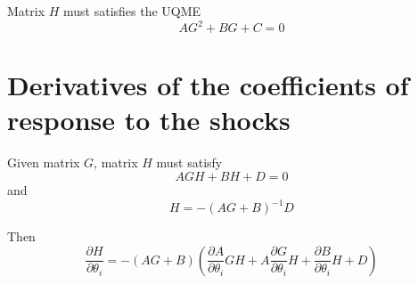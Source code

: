 \documentclass{article}
\begin{document}
Matrix $H$ must satisfies the UQME
\[
A G^2 + B G + C = 0
\]

\section{Derivatives of the coefficients of response to the shocks}
Given matrix $G$, matrix $H$ must satisfy
\[
A G H + BH + D = 0
\]
and
\[
H = -(AG + B)^{-1}D
\]

Then
\[
\frac{\partial H}{\partial \theta_i} = -(AG + B)\left(\frac{\partial
  A}{\partial \theta_i}GH + A\frac{\partial G}{\partial \theta_i}H +
  \frac{\partial B}{\partial \theta_i}H + D\right)
\]
\end{document}
